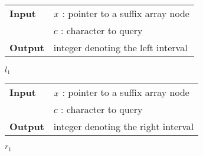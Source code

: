 \begin{figure*}
\begin{minipage}[t]{.5\textwidth}
\begin{algorithm}[H]
\label{alg:sa-lower}
\begin{tabular}{ll}
\textbf{Input}  & $x$ : pointer to a suffix array node\\
				& $c$ : character to query\\
\textbf{Output} & integer denoting the left interval\\
\end{tabular}
\begin{algorithmic}[1]
	\Else
	\EndIf
\EndWhile
\State \Return $l_1$
\end{algorithmic}
\end{algorithm}
\end{minipage}
\hfill
\begin{minipage}[t]{.5\textwidth}
\begin{algorithm}[H]
\label{alg:sa-upper}
\begin{tabular}{ll}
\textbf{Input}  & $x$ : pointer to a suffix array node\\
				& $c$ : character to query\\
\textbf{Output} & integer denoting the right interval\\
\end{tabular}
\begin{algorithmic}[1]
	\Else
	\EndIf
\EndWhile
\State \Return $r_1$
\end{algorithmic}
\end{algorithm}
\end{minipage}
\end{figure*}

